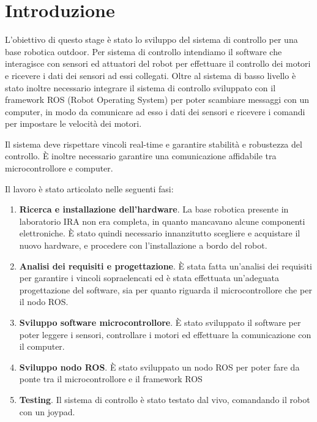 \chapter{Introduzione}

L'obiettivo di questo stage è stato lo sviluppo del sistema di controllo per una base robotica outdoor. Per sistema di controllo intendiamo il software che interagisce con sensori ed attuatori del robot per effettuare il controllo dei motori e ricevere i dati dei sensori ad essi collegati. Oltre al sistema di basso livello è stato inoltre necessario integrare il sistema di controllo sviluppato con il framework ROS (Robot Operating System) per poter scambiare messaggi con un computer, in modo da comunicare ad esso i dati dei sensori e ricevere i comandi per impostare le velocità dei motori.

Il sistema deve rispettare vincoli real-time e garantire stabilità e robustezza del controllo. È inoltre necessario garantire una comunicazione affidabile tra microcontrollore e computer.

Il lavoro è stato articolato nelle seguenti fasi:

\begin{enumerate}
    \item \textbf{Ricerca e installazione dell'hardware}. La base robotica presente in laboratorio IRA non era completa, in quanto mancavano alcune componenti elettroniche. È stato quindi necessario innanzitutto scegliere e acquistare il nuovo hardware, e procedere con l'installazione a bordo del robot.
    \item \textbf{Analisi dei requisiti e progettazione}. È stata fatta un'analisi dei requisiti per garantire i vincoli sopraelencati ed è stata effettuata un'adeguata progettazione del software, sia per quanto riguarda il microcontrollore che per il nodo ROS.
    \item \textbf{Sviluppo software microcontrollore}. È stato sviluppato il software per poter leggere i sensori, controllare i motori ed effettuare la comunicazione con il computer.
    \item \textbf{Sviluppo nodo ROS}. È stato sviluppato un nodo ROS per poter fare da ponte tra il microcontrollore e il framework ROS
    \item \textbf{Testing}. Il sistema di controllo è stato testato dal vivo, comandando il robot con un joypad.
\end{enumerate}
